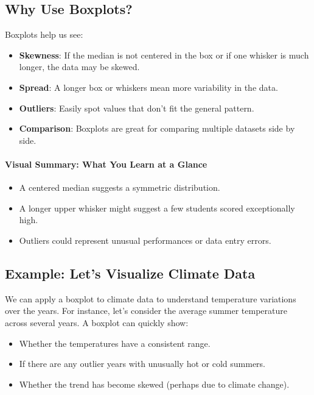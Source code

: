 \subsection*{Why Use Boxplots?}

Boxplots help us see:
\begin{itemize}
  \item \textbf{Skewness}: If the median is not centered in the box or if one whisker is much longer, the data may be skewed.
  \item \textbf{Spread}: A longer box or whiskers mean more variability in the data.
  \item \textbf{Outliers}: Easily spot values that don’t fit the general pattern.
  \item \textbf{Comparison}: Boxplots are great for comparing multiple datasets side by side.
\end{itemize}

\paragraph{Visual Summary: What You Learn at a Glance}

\begin{itemize}
  \item A centered median suggests a symmetric distribution.
  \item A longer upper whisker might suggest a few students scored exceptionally high.
  \item Outliers could represent unusual performances or data entry errors.
\end{itemize}

\subsection*{Example: Let’s Visualize Climate Data}

We can apply a boxplot to climate data to understand temperature variations over the years. For instance, let’s consider the average summer temperature across several years. A boxplot can quickly show:
\begin{itemize}
  \item Whether the temperatures have a consistent range.
  \item If there are any outlier years with unusually hot or cold summers.
  \item Whether the trend has become skewed (perhaps due to climate change).
\end{itemize}

